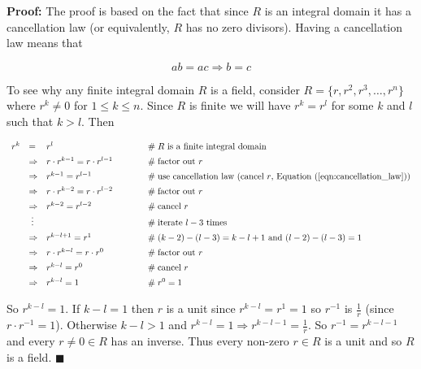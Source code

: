 \documentclass[11pt, oneside]{article}   	%
\theoremstyle{definition}
\begin{document}
\bigskip
\noindent
\textbf{Proof:} The proof is based on the fact that since $R$ is
an integral domain it has a cancellation law (or equivalently,
$R$ has no zero divisors).  Having a cancellation law means that

\begin{equation}
ab = ac \Rightarrow b = c
\label{eqn:cancellation_law}
\end{equation}


\bigskip
\noindent
To see why any finite integral domain $R$ is a field, consider $R
= \{r, r^2, r^3, \hdots, r^n\}$ where $r^k \neq 0$ for $1 \leq k
\leq n$.  Since $R$ is finite we will have $r^k = r^l$ for some
$k$ and $l$ such that $k > l$. Then

\begin{equation*}
\begin{array}{rlll} 
r^k 
&=& r^l                                                 &\quad \qquad \mathrel{\#} \text{$R$ is a finite integral domain} \\
[5pt]
&\Rightarrow& r \cdot r^{k-1} = r \cdot r^{l -1}        &\quad \qquad \mathrel{\#} \text{factor out $r$} \\
[5pt]
&\Rightarrow& r^{k-1} = r^{l -1}                        &\quad \qquad \mathrel{\#} \text{use cancellation law (cancel $r$, Equation (\ref{eqn:cancellation_law})}) \\
[5pt]
&\Rightarrow& r \cdot r^{k-2} = r \cdot r^{l -2}        &\quad \qquad \mathrel{\#} \text{factor out $r$} \\
[5pt]
&\Rightarrow& r^{k-2} = r^{l -2}                        &\quad \qquad \mathrel{\#} \text{cancel $r$} \\
&\;\vdots												&&\quad \qquad \mathrel{\#} \text{iterate $l - 3$ times} \\ 
[5pt]
&\Rightarrow& r^{k - l + 1} = r^1                       &\quad \qquad \mathrel{\#} (k - 2) - (l -3) = k - l + 1 \text{ and } (l - 2) - (l - 3) = 1 \\
[5pt]       
&\Rightarrow& r \cdot r^{k - l} = r \cdot r^0           &\quad \qquad \mathrel{\#} \text{factor out $r$} \\ 
[5pt]
&\Rightarrow& r^{k-l} = r^{0}                           &\quad \qquad \mathrel{\#} \text{cancel $r$} \\ 
[5pt]
&\Rightarrow& r^{k-l} = 1                               &\quad \qquad\mathrel{\#} r^0 = 1
\end{array}
\end{equation*}

\bigskip
{}
\noindent
So $ r^{k-l} = 1 $. If $k-l = 1$ then $r$ is a unit since
$r^{k-l} = r^{1} = 1$ so $r^{-1}$ is $\frac{1}{r}$ (since $r
\cdot r^{-1} = 1$). Otherwise $k-l > 1$ and $r^{k-l} = 1
\Rightarrow r^{k-l-1} = \frac{1}{r}$.  So $r^{-1} = r^{k-l -1}$
and every $r \neq 0 \in R$ has an inverse. Thus every non-zero $r
\in R$ is a unit and so $R$ is a field. $\blacksquare$
\end{document}
